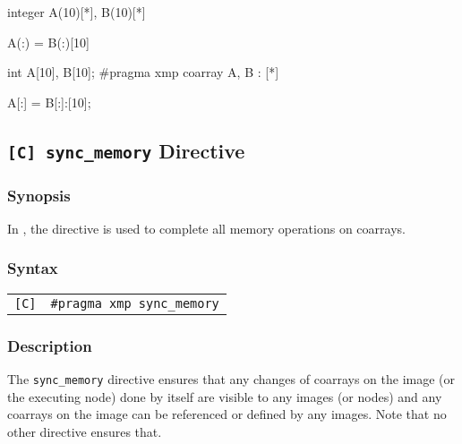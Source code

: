 \begin{minipage}{0.45\hsize}
\begin{center}
\begin{Fexample}
      integer A(10)[*], B(10)[*]


      A(:) = B(:)[10]
\end{Fexample}
\end{center}
\end{minipage}
%
\begin{minipage}{0.45\hsize}
\begin{center}
\begin{XCexampleR}
int A[10], B[10];
#pragma xmp coarray A, B : [*]

A[:] = B[:]:[10];
\end{XCexampleR}
\end{center}
\end{minipage}


\subsection{{\tt [C] sync\_memory} Directive}

\subsubsection*{Synopsis}

In {\XMPC}, the  directive is used to complete
all memory operations on coarrays.

\subsubsection*{Syntax}

\begin{tabular}{ll}
\verb![C]! & \verb|#pragma xmp sync_memory| \\
\end{tabular}

\subsubsection*{Description}


The {\tt sync\_memory} directive ensures that any changes of coarrays
on the image (or the executing node) done by itself are visible to any
images (or nodes) and any coarrays on the image can be referenced or
defined by any images.
%
Note that no other {\XMP} directive ensures that.

